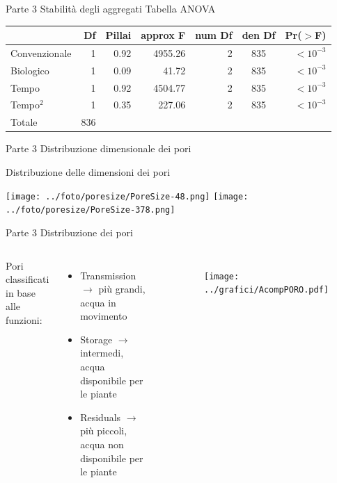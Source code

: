 \documentclass[xcolor={usenames, table, x11names}, final, 10pt]{beamer}
\begin{document}
\begin{frame}[label=Anova]{Parte 3 \small{Stabilità degli aggregati}}
  \hyperlink{Composizionale}{}
  \footnotesize
  Tabella ANOVA 
  \begin{table}
    \centering
    \begin{tabular}{lrrrrcr}
      \toprule
      & Df&Pillai& approx F & num Df & den Df & Pr($>$F) \\ 
      \midrule
      Convenzionale & 1 & 0.92 & 4955.26  &      2 &    835 & $<10^{-3}$\\ 
      Biologico     & 1 & 0.09 & 41.72    &      2 &    835 & $<10^{-3}$\\ 
      Tempo         & 1 & 0.92 & 4504.77  &      2 &    835 & $<10^{-3}$\\ 
      Tempo$^2$     & 1 & 0.35 & 227.06   &      2 &    835 & $<10^{-3}$\\ 
      Totale        & 836 &    &          &        &        &          \\ 
      \bottomrule
    \end{tabular}
  \end{table}
\end{frame}

\begin{frame}{Parte 3 \small{Distribuzione dimensionale dei pori}}
\begin{center}
\LARGE Distribuzione delle dimensioni dei pori

\vspace{1.5cm}

    \texttt{[image: ../foto/poresize/PoreSize-48.png]}
    \texttt{[image: ../foto/poresize/PoreSize-378.png]}
\end{center}
\end{frame}


\begin{frame}[label=Porosimetria]{Parte 3 \small{Distribuzione dei pori}}
\begin{columns}
\footnotesize{
Pori classificati in base alle funzioni:
\begin{itemize}
    \item Transmission $\rightarrow$ più grandi, acqua in movimento
    \item Storage $\rightarrow$ intermedi, acqua disponibile per le
      piante
    \item Residuals $\rightarrow$ più piccoli, acqua non disponibile
      per le piante
\end{itemize}}
\hyperlink{finale}{}
  
  \begin{figure}
    \texttt{[image: ../grafici/AcompPORO.pdf]}
  \end{figure}

\end{columns}
\end{frame}
\end{document}
